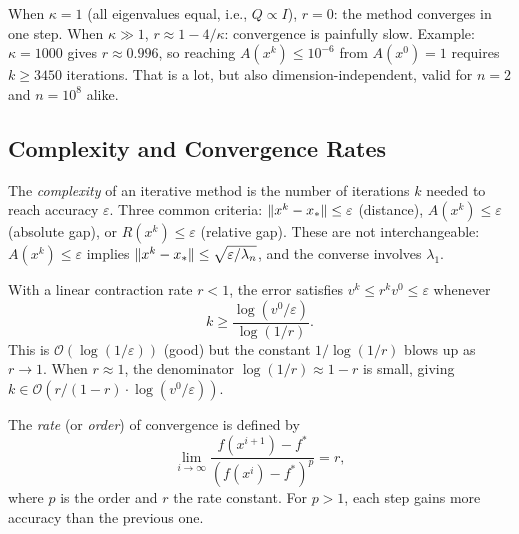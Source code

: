 When $\kappa = 1$ (all eigenvalues equal, i.e., $Q \propto I$), $r = 0$: the method converges in one step.
When $\kappa \gg 1$, $r \approx 1 - 4/\kappa$: convergence is painfully slow.
Example: $\kappa = 1000$ gives $r \approx 0.996$, so reaching $A(x^k) \leq 10^{-6}$ from $A(x^0) = 1$ requires $k \geq 3450$ iterations.
That is a lot, but also dimension-independent, valid for $n = 2$ and $n = 10^8$ alike.


\subsection{Complexity and Convergence Rates}\label{sec:complexity-rates}

\begin{definition}[Complexity]\label{def:complexity}
	The \textit{complexity} of an iterative method is the number of iterations $k$ needed to reach accuracy $\varepsilon$.
	Three common criteria: $\lVert x^k - x_*\rVert \leq \varepsilon$ (distance), $A(x^k) \leq \varepsilon$ (absolute gap), or $R(x^k) \leq \varepsilon$ (relative gap).
	These are not interchangeable: $A(x^k) \leq \varepsilon$ implies $\lVert x^k - x_*\rVert \leq \sqrt{\varepsilon / \lambda_n}$, and the converse involves $\lambda_1$.
\end{definition}

With a linear contraction rate $r < 1$, the error satisfies $v^k \leq r^k v^0 \leq \varepsilon$ whenever
\begin{equation}\label{eq:linear-iteration-count}
	k \geq \frac{\log(v^0 / \varepsilon)}{\log(1/r)}.
\end{equation}
This is $\mathcal{O}(\log(1/\varepsilon))$ (good) but the constant $1/\log(1/r)$ blows up as $r \to 1$.
When $r \approx 1$, the denominator $\log(1/r) \approx 1 - r$ is small, giving $k \in \mathcal{O}(r/(1-r) \cdot \log(v^0/\varepsilon))$.

\begin{definition}\label{def:rate-convergence}
	The \textit{rate} (or \textit{order}) of convergence is defined by
	\begin{equation}\label{eq:convergence-rate}
		\lim_{i \to \infty} \frac{f(x^{i+1}) - f^*}{(f(x^i) - f^*)^p} = r,
	\end{equation}
	where $p$ is the order and $r$ the rate constant.
	For $p > 1$, each step gains more accuracy than the previous one.
\end{definition}

